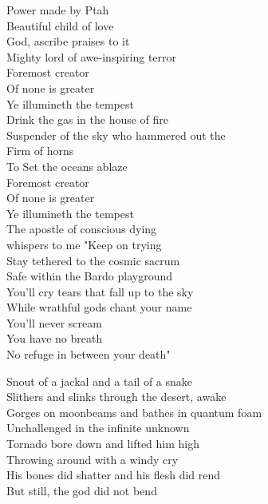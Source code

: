 
Power made by Ptah \\
Beautiful child of love \\
God, ascribe praises to it \\
Mighty lord of awe-inspiring terror \\
Foremost creator \\
Of none is greater \\
Ye illumineth the tempest \\

Drink the gas in the house of fire \\
Suspender of the sky who hammered out the  \\
Firm of horns \\
To Set the oceans ablaze \\
Foremost creator \\
Of none is greater \\
Ye illumineth the tempest \\

The apostle of conscious dying \\
whispers to me "Keep on trying \\
Stay tethered to the cosmic sacrum \\
Safe within the Bardo playground \\
You'll cry tears that fall up to the sky \\
While wrathful gods chant your name \\
You'll never scream \\
You have no breath \\
No refuge in between your death" \\



Snout of a jackal and a tail of a snake \\
Slithers and slinks through the desert, awake \\
Gorges on moonbeams and bathes in quantum foam \\
Unchallenged in the infinite unknown \\

Tornado bore down and lifted him high \\
Throwing  around with a windy cry \\
His bones did shatter and his flesh did rend \\
But still, the god did not bend \\

